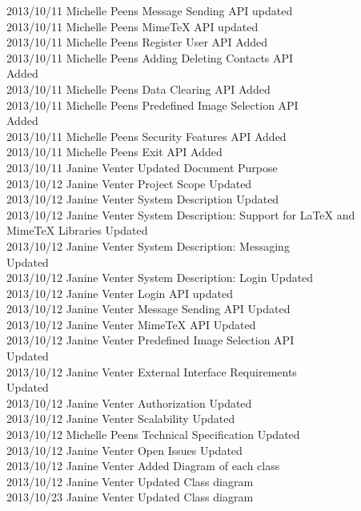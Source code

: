 \documentclass[29pt,a4paper]{moderncv}
\begin{document}
\begin{tabbing}
2013/10/11  \> Michelle Peens \> Message Sending API updated\\
2013/10/11  \> Michelle Peens \> MimeTeX API updated\\
2013/10/11  \> Michelle Peens \> Register User API Added\\
2013/10/11  \> Michelle Peens \> Adding Deleting Contacts API \\ \> \> \> Added\\
2013/10/11  \> Michelle Peens \> Data Clearing API Added\\
2013/10/11  \> Michelle Peens \> Predefined Image Selection API \\ \> \> \> Added\\
2013/10/11  \> Michelle Peens \> Security Features API Added\\
2013/10/11  \> Michelle Peens \> Exit API Added\\
2013/10/11  \> Janine Venter \> Updated Document Purpose\\
2013/10/12  \> Janine Venter \> Project Scope Updated\\
2013/10/12  \> Janine Venter \> System Description Updated\\
2013/10/12  \> Janine Venter \> System Description: Support for LaTeX and \\ \> \> \> MimeTeX Libraries Updated\\
2013/10/12  \> Janine Venter \> System Description: Messaging \\ \> \> \> Updated\\
2013/10/12  \> Janine Venter \> System Description: Login Updated\\
2013/10/12  \> Janine Venter \> Login API updated\\
2013/10/12  \> Janine Venter \> Message Sending API Updated\\
2013/10/12  \> Janine Venter \> MimeTeX API Updated\\
2013/10/12  \> Janine Venter \> Predefined Image Selection API \\ \> \> \> Updated\\
2013/10/12  \> Janine Venter \> External Interface Requirements \\ \> \> \> Updated\\
2013/10/12  \> Janine Venter \> Authorization Updated \\
2013/10/12  \> Janine Venter \> Scalability Updated \\
2013/10/12  \> Michelle Peens \> Technical Specification Updated \\
2013/10/12  \> Janine Venter \> Open Issues Updated \\
2013/10/12  \> Janine Venter \> Added Diagram of each class\\
2013/10/12  \> Janine Venter \> Updated Class diagram\\
2013/10/23  \> Janine Venter \> Updated Class diagram\\

\end{tabbing}
\end{document}
